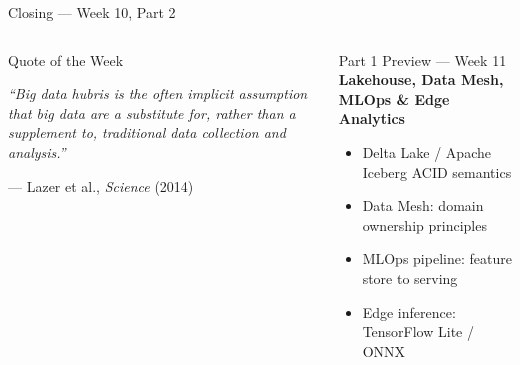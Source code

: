 \documentclass[aspectratio=169,10pt]{beamer}
\begin{document}
\begin{frame}{Closing — Week 10, Part 2}
\begin{columns}[T]
      \begin{alertblock}{Quote of the Week}
        \begin{center}
        \large\itshape
        ``Big data hubris is the often
        implicit assumption that big data
        are a substitute for, rather than
        a supplement to, traditional
        data collection and analysis.''
        \end{center}
        \begin{flushright}
        \small --- Lazer et al., \textit{Science} (2014)
        \end{flushright}
      \end{alertblock}
      \vspace{6pt}
      \begin{exampleblock}{Part 1 Preview — Week 11}
        \textbf{Lakehouse, Data Mesh, MLOps \& Edge Analytics}\\[3pt]
        \begin{itemize}\setlength\itemsep{1pt}
          \item Delta Lake / Apache Iceberg ACID semantics
          \item Data Mesh: domain ownership principles
          \item MLOps pipeline: feature store to serving
          \item Edge inference: TensorFlow Lite / ONNX
        \end{itemize}
      \end{exampleblock}
  \end{columns}
\end{frame}

\end{document}
